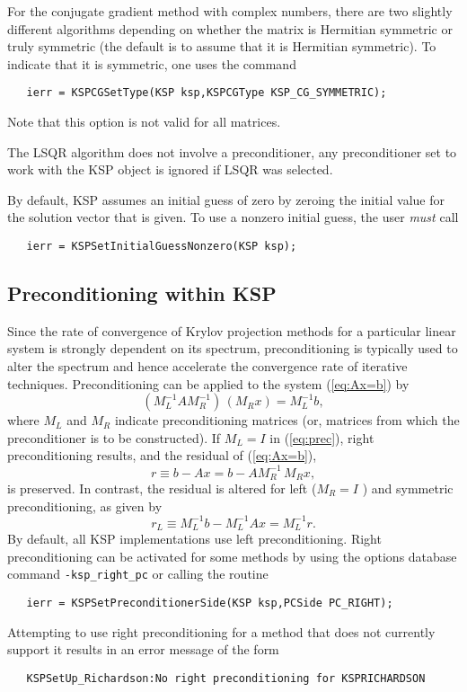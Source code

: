 For the conjugate gradient method with complex numbers, there are two
slightly different algorithms depending on whether the matrix is 
Hermitian symmetric or truly symmetric (the default is to assume that
it is Hermitian symmetric). To indicate that it is symmetric, one uses the command
  
\begin{verbatim}
   ierr = KSPCGSetType(KSP ksp,KSPCGType KSP_CG_SYMMETRIC);
\end{verbatim}
Note that this option is not valid for all matrices.

The LSQR algorithm does not involve a preconditioner, any preconditioner
set to work with the KSP object is ignored if LSQR was selected.

By default, KSP assumes an initial guess of zero by zeroing the initial 
value for the solution vector that is given. To use a nonzero 
initial guess, the user {\em must} call 
\begin{verbatim}
   ierr = KSPSetInitialGuessNonzero(KSP ksp);
\end{verbatim}

\subsection{Preconditioning within KSP} 
\label{sec:ksppc}

Since the rate of convergence of Krylov projection methods for a
particular linear system is strongly dependent on its spectrum,
preconditioning is typically used to alter the spectrum and hence
accelerate the convergence rate of iterative techniques.
Preconditioning can be applied to the system (\ref{eq:Ax=b}) by
\begin{equation}
   (M_L^{-1} A M_R^{-1}) \, (M_R x) = M_L^{-1} b,
\label{eq:prec}
\end{equation}
where $ M_L$ and $ M_R $ indicate preconditioning matrices (or, matrices
from which the preconditioner is to be constructed).  If $ M_L = I $
in (\ref{eq:prec}), right preconditioning results, and the
residual of (\ref{eq:Ax=b}),
  \[ r \equiv b - Ax = b - A M_R^{-1} \, M_R x, \]
is preserved.  In contrast, the residual is altered for left 
($ M_R = I $ ) and symmetric preconditioning, as given by
  \[ r_L \equiv M_L^{-1} b - M_L^{-1} A x = M_L^{-1} r. \]
By default, all KSP implementations use left preconditioning.  
Right preconditioning can be activated for some methods by
using the options database command {\tt -ksp\_right\_pc} or
calling the routine  
\begin{verbatim}
   ierr = KSPSetPreconditionerSide(KSP ksp,PCSide PC_RIGHT);
\end{verbatim}
Attempting to use right preconditioning for a method that
does not currently support it results in an error message of the form
\begin{verbatim}
   KSPSetUp_Richardson:No right preconditioning for KSPRICHARDSON
\end{verbatim}


